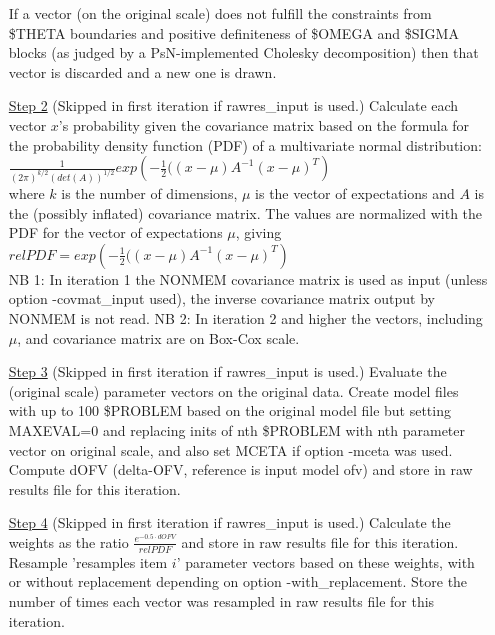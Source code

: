 \begin{itemize}
If a vector (on the original scale) does not fulfill the constraints from \$THETA boundaries
and positive definiteness of \$OMEGA and
\$SIGMA blocks (as judged by a PsN-implemented Cholesky decomposition) 
then that vector is 
discarded and a new one is drawn.
\item[\underline{Step 2}] (Skipped in first iteration if rawres\_input is used.)
Calculate each vector $x$’s probability 
given the covariance matrix based on the formula for the probability 
density function (PDF) of a multivariate normal distribution:\\
\begin{math}
\frac{1}{\left(2\pi\right)^{k/2}\left(det\left(A\right)\right)^{1/2}} exp\left(-\frac{1}{2}(\left(x-\mu\right)A^{-1} \left(x-\mu\right)^T\right)
\end{math}
\\
where $k$ is the number of dimensions, 
$\mu$ is the vector of expectations and $A$ is the (possibly inflated) covariance matrix.
The values are normalized with the PDF for the vector of expectations $\mu$, giving\\
\begin{math}
relPDF=exp\left(-\frac{1}{2}(\left(x-\mu\right)A^{-1} \left(x-\mu\right)^T\right)
\end{math}
\\
NB 1: In iteration 1 the NONMEM covariance matrix is used as input (unless option -covmat\_input used), the inverse covariance matrix
output by NONMEM is not read.
NB 2: In iteration 2 and higher the vectors, including $\mu$, and covariance matrix are on Box-Cox scale.
\item[\underline{Step 3}] (Skipped in first iteration if rawres\_input is used.)
Evaluate the (original scale) parameter vectors on the original data.
Create model files with up to 100 \$PROBLEM based on the original model file but setting MAXEVAL=0
and replacing inits of nth \$PROBLEM with nth parameter vector on original scale, and also set MCETA if option -mceta was used. Compute dOFV 
(delta-OFV, reference is input model ofv) and store in raw results file for this iteration.
\item[\underline{Step 4}] (Skipped in first iteration if rawres\_input is used.)
Calculate the weights as the ratio $\frac{e^{-0.5\cdot dOFV}}{relPDF}$ and store in raw results file for this iteration. 
Resample 'resamples item $i$' parameter vectors based on these weights, with or without replacement depending on option -with\_replacement. 
Store the number of times each vector was resampled in raw results file for this iteration.

\end{itemize}
